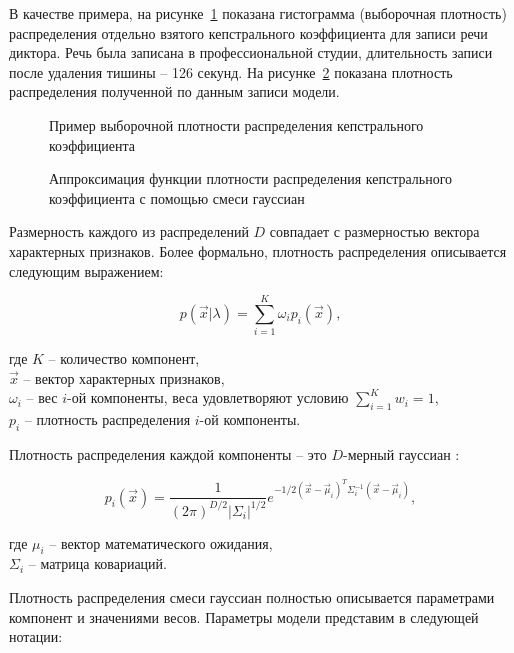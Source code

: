 В качестве примера, на рисунке~\ref{fig:gmm_hist} показана гистограмма (выборочная плотность) распределения отдельно взятого кепстрального коэффициента для записи речи диктора. Речь была записана в профессиональной студии, длительность записи после удаления тишины -- 126 секунд. На рисунке~\ref{fig:gmm_pdf} показана плотность распределения полученной по данным записи модели.

\begin{figure}[t!]
\caption{Пример выборочной плотности распределения кепстрального коэффициента}
\label{fig:gmm_hist}
\end{figure}
\begin{figure}[h!]
\caption{Аппроксимация функции плотности распределения кепстрального коэффициента с помощью смеси гауссиан}
\label{fig:gmm_pdf}
\end{figure}

Размерность каждого из распределений $D$ совпадает с размерностью вектора характерных признаков. Более формально, плотность распределения описывается следующим выражением:

\begin{equation}
p(\vec x | \lambda) = \sum_{i=1}^K{\omega_i p_i(\vec x)},
\end{equation}

\noindent где $K$ -- количество компонент,\\
$\vec x$ -- вектор характерных признаков,\\
$\omega_i$ -- вес $i$-ой компоненты, веса удовлетворяют условию $\sum_{i=1}^K w_i = 1$,\\
$p_i$ -- плотность распределения $i$-ой компоненты.

Плотность распределения каждой компоненты -- это $D$-мерный гауссиан \cite{BMSTUM16}:

\begin{equation}
\label{eq:mdnormalpdf}
p_i(\vec x) = \frac{1}{(2\pi)^{D/2} |\Sigma_i|^{1/2}}e^{-1/2(\vec x - \vec \mu_i)^T \Sigma_i^{-1} (\vec x - \vec \mu_i)},
\end{equation}

\noindent где $\mu_i$ -- вектор математического ожидания,\\
$\Sigma_i$ -- матрица ковариаций.

Плотность распределения смеси гауссиан полностью описывается параметрами компонент и значениями весов. Параметры модели представим в следующей нотации:

